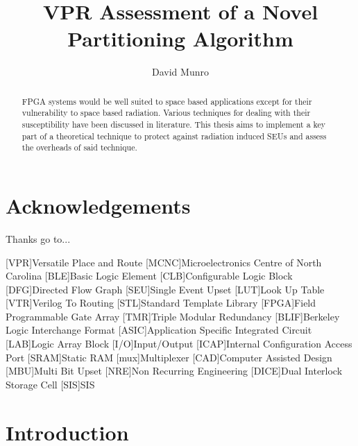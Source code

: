 \documentclass[12pt,final,oneside]{memoir} %
\title{VPR Assessment of a Novel Partitioning Algorithm}
\author{David Munro}
\begin{document}
\maketitle
\begin{abstract}
	\ac{FPGA} systems would be well suited to space based applications except for their vulnerability to space based radiation. Various techniques for dealing with their susceptibility have been discussed in literature. This thesis aims to implement a key part of a theoretical technique to protect against radiation induced \acp{SEU} and assess the overheads of said technique.
\acresetall
\end{abstract}
\chapter*{Acknowledgements}
Thanks go to...

\tableofcontents*
\newpage

\begin{acronym}
[VPR]{Versatile Place and Route}
[MCNC]{Microelectronics Centre of North Carolina}
[BLE]{Basic Logic Element}
[CLB]{Configurable Logic Block}
[DFG]{Directed Flow Graph}
[SEU]{Single Event Upset}
[LUT]{Look Up Table}
[VTR]{Verilog To Routing}
[STL]{Standard Template Library}
[FPGA]{Field Programmable Gate Array}
[TMR]{Triple Modular Redundancy}
[BLIF]{Berkeley Logic Interchange Format}
[ASIC]{Application Specific Integrated Circuit}
[LAB]{Logic Array Block}
[I/O]{Input/Output}
[ICAP]{Internal Configuration Access Port}
[SRAM]{Static RAM}
[mux]{Multiplexer}
[CAD]{Computer Assisted Design}
[MBU]{Multi Bit Upset}
[NRE]{Non Recurring Engineering}
[DICE]{Dual Interlock Storage Cell}
[SIS]{SIS}
\end{acronym}
\chapter{Introduction}
\end{document}
